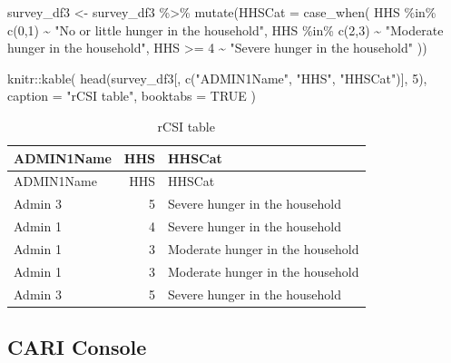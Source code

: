 \documentclass[
  letterpaper,
  DIV=11,
  numbers=noendperiod]{scrreprt}
\newenvironment{Shaded}{\begin{snugshade}}{\end{snugshade}}
\newcommand{\AttributeTok}[1]{\textcolor[rgb]{0.40,0.45,0.13}{#1}}
\newcommand{\ConstantTok}[1]{\textcolor[rgb]{0.56,0.35,0.01}{#1}}
\newcommand{\DecValTok}[1]{\textcolor[rgb]{0.68,0.00,0.00}{#1}}
\newcommand{\FunctionTok}[1]{\textcolor[rgb]{0.28,0.35,0.67}{#1}}
\newcommand{\NormalTok}[1]{\textcolor[rgb]{0.00,0.23,0.31}{#1}}
\newcommand{\OtherTok}[1]{\textcolor[rgb]{0.00,0.23,0.31}{#1}}
\newcommand{\SpecialCharTok}[1]{\textcolor[rgb]{0.37,0.37,0.37}{#1}}
\newcommand{\StringTok}[1]{\textcolor[rgb]{0.13,0.47,0.30}{#1}}
\begin{document}
\begin{Shaded}
\begin{Highlighting}[]
\NormalTok{survey\_df3 }\OtherTok{\textless{}{-}}\NormalTok{ survey\_df3 }\SpecialCharTok{\%\textgreater{}\%}
  \FunctionTok{mutate}\NormalTok{(}\AttributeTok{HHSCat =} \FunctionTok{case\_when}\NormalTok{(}
\NormalTok{    HHS }\SpecialCharTok{\%in\%} \FunctionTok{c}\NormalTok{(}\DecValTok{0}\NormalTok{,}\DecValTok{1}\NormalTok{) }\SpecialCharTok{\textasciitilde{}} \StringTok{"No or little hunger in the household"}\NormalTok{,}
\NormalTok{    HHS }\SpecialCharTok{\%in\%} \FunctionTok{c}\NormalTok{(}\DecValTok{2}\NormalTok{,}\DecValTok{3}\NormalTok{) }\SpecialCharTok{\textasciitilde{}} \StringTok{"Moderate hunger in the household"}\NormalTok{,}
\NormalTok{    HHS }\SpecialCharTok{\textgreater{}=} \DecValTok{4} \SpecialCharTok{\textasciitilde{}} \StringTok{"Severe hunger in the household"}
\NormalTok{  ))}
\end{Highlighting}
\end{Shaded}

\begin{Shaded}
\begin{Highlighting}[]
\NormalTok{knitr}\SpecialCharTok{::}\FunctionTok{kable}\NormalTok{(}
  \FunctionTok{head}\NormalTok{(survey\_df3[, }\FunctionTok{c}\NormalTok{(}\StringTok{"ADMIN1Name"}\NormalTok{, }\StringTok{"HHS"}\NormalTok{, }\StringTok{"HHSCat"}\NormalTok{)], }\DecValTok{5}\NormalTok{),}
  \AttributeTok{caption =} \StringTok{"rCSI table"}\NormalTok{,}
  \AttributeTok{booktabs =} \ConstantTok{TRUE}
\NormalTok{)}
\end{Highlighting}
\end{Shaded}

\begin{longtable}[]{@{}lrl@{}}
\caption{rCSI table}\tabularnewline
\toprule\noalign{}
ADMIN1Name & HHS & HHSCat \\
\midrule\noalign{}
\endfirsthead
\toprule\noalign{}
ADMIN1Name & HHS & HHSCat \\
\midrule\noalign{}
\endhead
\bottomrule\noalign{}
\endlastfoot
Admin 3 & 5 & Severe hunger in the household \\
Admin 1 & 4 & Severe hunger in the household \\
Admin 1 & 3 & Moderate hunger in the household \\
Admin 1 & 3 & Moderate hunger in the household \\
Admin 3 & 5 & Severe hunger in the household \\
\end{longtable}

\subsection{CARI Console}\label{cari-console}
\end{document}
